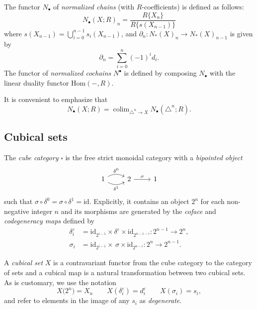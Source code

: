 \documentclass[A4]{amsart}
\theoremstyle{definition}
\newcommand{\Hom}{\mathrm{Hom}}
\DeclareMathOperator*{\colim}{colim}
\begin{document}
The functor $N_\bullet$ of \textit{normalized chains} (with $R$-coefficients) is defined as follows: 
\begin{equation*}
N_\bullet(X; R)_n = \frac{R \{ X_n \}}{R \{ s(X_{n-1}) \}}
\end{equation*}
where $s(X_{n-1}) = \bigcup_{i=0}^{n-1} s_i(X_{n-1})$, and $\partial_n : N_*(X)_n \to N_*(X)_{n-1}$ is given by
\begin{equation*}
\partial_n = \sum_{i=0}^{n} (-1)^id_{i}.
\end{equation*}
The functor of \textit{normalized cochains} $N^\bullet$ is defined by composing $N_\bullet$ with the linear duality functor $\Hom(-, R)$.

It is convenient to emphasize that
\begin{equation*}
N_\bullet(X; R) = \colim_{\triangle^n \to X} N_\bullet(\triangle^n; R).
\end{equation*}

\subsection{Cubical sets}

The \textit{cube category} $\square$ is the free strict monoidal category with a \textit{bipointed object}
\begin{equation*}
\begin{tikzcd}
1 \arrow[r, bend left, "\delta^0"] \arrow[r, bend right, "\delta^1"'] & 2 \arrow[r, "\sigma"] & 1
\end{tikzcd}
\end{equation*}
such that $\sigma \circ \delta^0 = \sigma \circ \delta^1 = \mathrm{id}$. Explicitly, it contains an object $2^n$ for each non-negative integer $n$ and its morphisms are generated by the \textit{coface} and \textit{codegeneracy maps} defined by
\begin{align*}
\delta_i^\varepsilon & = \mathrm{id}_{2^{i-1}} \times \delta^\varepsilon \times \mathrm{id}_{2^{n-1-i}} \colon 2^{n-1} \to 2^n, \\
\sigma_i & = \mathrm{id}_{2^{i-1}} \times \, \sigma \times \mathrm{id}_{2^{n-i}} \colon 2^{n} \to 2^{n-1}.
\end{align*}

A \textit{cubical set} $X$ is a contravariant functor from the cube category to the category of sets and a cubical map is a natural transformation between two cubical sets. As is customary, we use the notation
\begin{equation*}
X\big( 2^n \big) = X_n \qquad X(\delta^\varepsilon_i) = d^\varepsilon_i \qquad X(\sigma_i) = s_i,
\end{equation*}
and refer to elements in the image of any $s_i$ as \textit{degenerate}.
\end{document}
